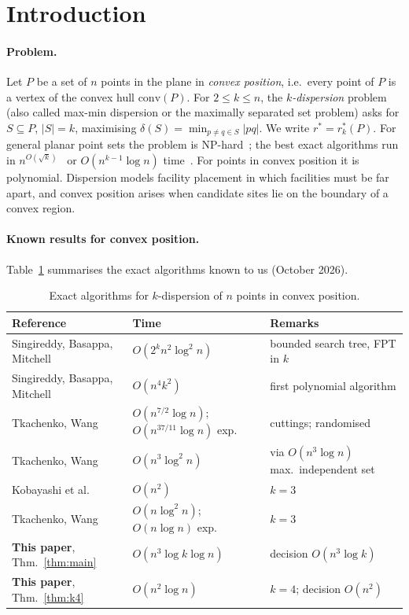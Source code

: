 \documentclass[11pt,a4paper]{article}
\theoremstyle{definition}
\newcommand{\opt}{r^{*}}
\begin{document}
\tableofcontents

\section{Introduction}

\paragraph{Problem.} Let $P$ be a set of $n$ points in the plane in
\emph{convex position}, i.e.\ every point of $P$ is a vertex of the convex hull
$\mathrm{conv}(P)$. For $2\le k\le n$, the \emph{$k$-dispersion} problem (also
called max-min dispersion or the maximally separated set problem) asks for
$S\subseteq P$, $|S|=k$, maximising $\delta(S)=\min_{p\ne q\in S}|pq|$. We
write $\opt=\opt_k(P)$. For general planar point sets the problem is
NP-hard~\cite{WK88}; the best exact algorithms run in
$n^{O(\sqrt k)}$~\cite{Akagi18} or $O(n^{k-1}\log n)$ time~\cite{CD25}. For
points in convex position it is polynomial. Dispersion models facility
placement in which facilities must be far apart, and convex position arises
when candidate sites lie on the boundary of a convex region.

\paragraph{Known results for convex position.} Table~\ref{tab:prior}
summarises the exact algorithms known to us (October 2026).

\begin{table}[h]
\centering
\caption{Exact algorithms for $k$-dispersion of $n$ points in convex position.}
\label{tab:prior}
\small
\begin{tabular}{@{}p{} p{} p{}@{}}
\toprule
Reference & Time & Remarks \\
\midrule
Singireddy, Basappa, Mitchell~\cite{SBM26} & $O(2^kn^2\log^2n)$ & bounded search tree, FPT in $k$\\
Singireddy, Basappa, Mitchell~\cite{SBM26} & $O(n^4k^2)$ & first polynomial algorithm \\
Tkachenko, Wang~\cite{TW25} & $O(n^{7/2}\log n)$; $O(n^{37/11}\log n)$ exp. & cuttings; randomised \\
Tkachenko, Wang~\cite{TW26} & $O(n^3\log^2n)$ & via $O(n^3\log n)$ max.\ independent set \\
Kobayashi et al.~\cite{Kob21} & $O(n^2)$ & $k=3$ \\
Tkachenko, Wang~\cite{TW25} & $O(n\log^2n)$; $O(n\log n)$ exp. & $k=3$ \\
\midrule
\textbf{This paper}, Thm.~\ref{thm:main} & $O(n^3\log k\log n)$ & decision $O(n^3\log k)$ \\
\textbf{This paper}, Thm.~\ref{thm:k4} & $O(n^2\log n)$ & $k=4$; decision $O(n^2)$ \\
\bottomrule
\end{tabular}
\end{table}
\end{document}
